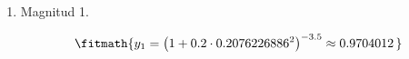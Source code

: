 \begin{enumerate}

\item Magnitud 1.

\[\fitmath{y_{1}={\left(1+0.2\cdot {0.2076226886}^{2}\right)}^{-3.5}\approx 0.9704012\,}\]

\end{enumerate}
